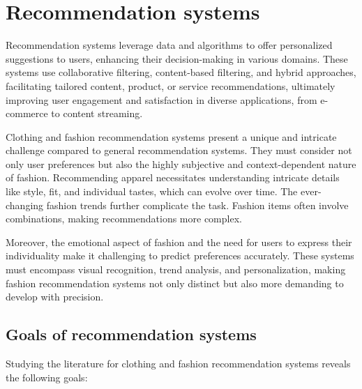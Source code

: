 \section{\textbf{Recommendation systems}} \label{section:rs}
	Recommendation systems leverage data and algorithms to offer personalized suggestions to users, enhancing their decision-making in various domains. These systems use collaborative filtering, content-based filtering, and hybrid approaches, facilitating tailored content, product, or service recommendations, ultimately improving user engagement and satisfaction in diverse applications, from e-commerce to content streaming.

	Clothing and fashion recommendation systems present a unique and intricate challenge compared to general recommendation systems. They must consider not only user preferences but also the highly subjective and context-dependent nature of fashion. Recommending apparel necessitates understanding intricate details like style, fit, and individual tastes, which can evolve over time. The ever-changing fashion trends further complicate the task. Fashion items often involve combinations, making recommendations more complex.

	Moreover, the emotional aspect of fashion and the need for users to express their individuality make it challenging to predict preferences accurately. These systems must encompass visual recognition, trend analysis, and personalization, making fashion recommendation systems not only distinct but also more demanding to develop with precision.

	\subsection{\textbf{Goals of recommendation systems}}
		Studying the literature for clothing and fashion recommendation systems reveals the following goals:

